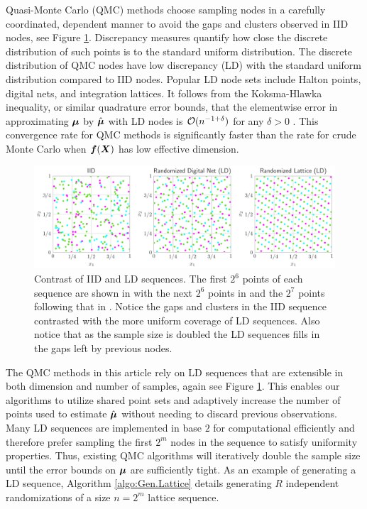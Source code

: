 \documentclass{article}[12pt]
\begin{document}
Quasi-Monte Carlo (QMC) methods choose sampling nodes in a carefully coordinated, dependent manner to avoid the gaps and clusters observed in IID nodes, see Figure \ref{fig:ld_seqs}. Discrepancy measures quantify how close the discrete distribution of such points is to the standard uniform distribution. The discrete distribution of QMC nodes have low discrepancy (LD) with the standard uniform distribution compared to IID nodes. Popular LD node sets include Halton points, digital nets, and integration lattices. It follows from the Koksma-Hlawka inequality, or similar quadrature error bounds, that the elementwise error in approximating $\boldsymbol{\mu}$ by $\hat{\boldsymbol{\mu}}$ with LD nodes is  $\mathcal{O}(n^{-1+\delta})$ for any $\delta > 0$ \cite{dick2013high,hickernell1998generalized}. This convergence rate for QMC methods is significantly faster than the rate for crude Monte Carlo when $\boldsymbol{f}(\boldsymbol{X})$ has low effective dimension. 

\begin{figure}[H]
    \centering
    \includegraphics[width=\textwidth]{figs/ld_seqs.pdf}
    \caption{Contrast of IID and LD sequences. The first $2^6$ points of each sequence are shown in  with the next $2^6$ points in  and the $2^7$ points following that in . Notice the gaps and clusters in the IID sequence contrasted with the more uniform coverage of LD sequences. Also notice that as the sample size is doubled the LD sequences fills in the gaps left by previous nodes.}
    \label{fig:ld_seqs}
\end{figure}

The QMC methods in this article rely on LD sequences that are extensible in both dimension and number of samples, again see Figure \ref{fig:ld_seqs}. This enables our algorithms to utilize shared point sets and adaptively increase the number of points used to estimate $\hat{\boldsymbol{\mu}}$ without needing to discard previous observations. Many LD sequences are implemented in base $2$ for computational efficiently and therefore prefer sampling the first $2^m$ nodes in the sequence to satisfy uniformity properties. Thus, existing QMC algorithms will iteratively double the sample size until the error bounds on $\boldsymbol{\mu}$ are sufficiently tight. As an example of generating a LD sequence, Algorithm \ref{algo:Gen.Lattice} details generating $R$ independent randomizations of a size $n=2^m$ lattice sequence. 
\end{document}
